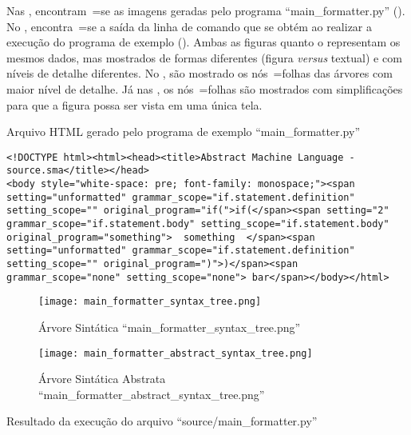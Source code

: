 Nas ,
encontram~=se as imagens geradas pelo programa ``main\_formatter.py'' ().
No ,
encontra~=se a saída da linha de comando que se obtém ao realizar a execução do programa de exemplo ().
Ambas as figuras  quanto o  representam os mesmos dados,
mas mostrados de formas diferentes (figura \textit{versus} textual) e
com níveis de detalhe diferentes.
No ,
são mostrado os nós~=folhas das árvores com maior nível de detalhe.
Já nas ,
os nós~=folhas são mostrados com simplificações para que a figura possa ser vista em uma única tela.
\begin{code}
\caption{Arquivo HTML gerado pelo programa de exemplo ``main\_formatter.py''}
\label{MainFormatterHtml}
\begin{verbatim}
<!DOCTYPE html><html><head><title>Abstract Machine Language - source.sma</title></head>
<body style="white-space: pre; font-family: monospace;"><span setting="unformatted" grammar_scope="if.statement.definition" setting_scope="" original_program="if(">if(</span><span setting="2" grammar_scope="if.statement.body" setting_scope="if.statement.body" original_program="something">  something  </span><span setting="unformatted" grammar_scope="if.statement.definition" setting_scope="" original_program=")">)</span><span grammar_scope="none" setting_scope="none"> bar</span></body></html>
\end{verbatim}
\end{code}

\begin{figure}[!htb]
\caption{Árvore Sintática ``main\_formatter\_syntax\_tree.png''}
\label{MainFormatterSyntaxTree}
\centering
\texttt{[image: main\_formatter\_syntax\_tree.png]}
\end{figure}

\begin{figure}[!htb]
\caption{Árvore Sintática Abstrata ``main\_formatter\_abstract\_syntax\_tree.png''}
\label{MainFormatterAbstractSyntaxTree}
\centering
\texttt{[image: main\_formatter\_abstract\_syntax\_tree.png]}
\end{figure}

\begin{code}
\caption{Resultado da execução do arquivo ``source/main\_formatter.py''}
\label{MainFormatterPyResult}
\inputminted{text}{aftertext/main_formatter_output.txt}
\end{code}


